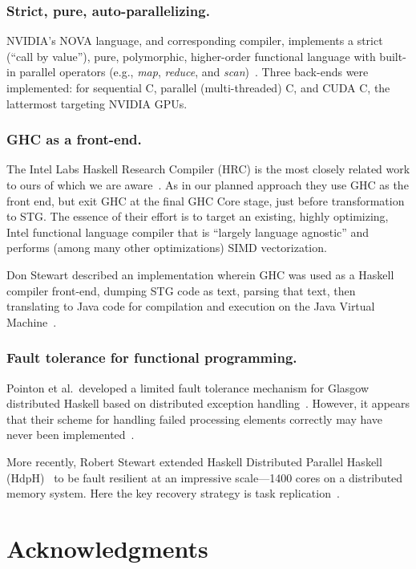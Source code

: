 \documentclass{llncs}
\begin{document}
\subsubsection{Strict, pure, auto-parallelizing.}
NVIDIA's NOVA language, and corresponding compiler, implements a strict
(``call by value''), pure, polymorphic, higher-order functional language with
built-in parallel operators (e.g., \emph{map}, \emph{reduce}, and
\emph{scan})~\cite{NVIDIA:2013}. Three back-ends were implemented: for
sequential C, parallel (multi-threaded) C, and CUDA C, the lattermost
targeting NVIDIA GPUs.

\subsubsection{GHC as a front-end.}
The Intel Labs Haskell Research Compiler (HRC) is the most closely related
work to ours of which we are aware~\cite{Liu:2013,Petersen:2013}.  As in our
planned approach they use GHC as the front end, but exit GHC at the final GHC
Core stage, just before transformation to STG.  The essence of their effort is
to target an existing, highly optimizing, Intel functional language compiler
that is ``largely language agnostic'' and performs (among many other
optimizations) SIMD vectorization.

Don Stewart described an implementation wherein GHC was used as a Haskell
compiler front-end, dumping STG code as text, parsing that text, then
translating to Java code for compilation and execution on the Java Virtual
Machine~\cite{Stewart-BSc}.

\subsubsection{Fault tolerance for functional programming.}
Pointon et al.\ developed a limited fault tolerance mechanism for Glasgow
distributed Haskell based on distributed exception
handling~\cite{Pointon:2001}.  However, it appears that their scheme for
handling failed processing elements correctly may have
never been implemented~\cite{Trinder:2000}.

More recently, Robert Stewart extended Haskell Distributed Parallel Haskell
(HdpH)~\cite{hdph} to be fault resilient at an impressive scale---1400 cores
on a distributed memory system.  Here the key recovery strategy is task
replication~\cite{Stewart:2013}.

\section{Acknowledgments}
\end{document}
